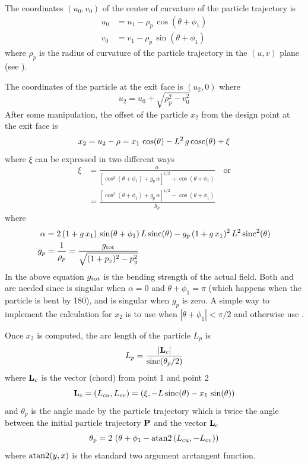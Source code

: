 The coordinates $(u_0, v_0)$ of the center of curvature of the particle trajectory is
\begin{align}
  u_0 &= u_1 - \rho_p \, \cos(\theta + \phi_1) \\
  v_0 &= v_1 - \rho_p \, \sin(\theta + \phi_1)
\end{align}
where $\rho_p$ is the radius of curvature of the particle trajectory in the $(u, v)$ plane (see
).

The coordinates of the particle at the exit face is $(u_2, 0)$ where
\begin{equation}
  u_2 = u_0 + \sqrt{\rho_p^2 - v_0^2}
\end{equation}
After some manipulation, the offset of the particle $x_2$ from the design point at the exit face is
\begin{equation}
  x_2 = u_2 - \rho = x_1 \, \cos(\theta) - L^2 \, g \, \text{cosc}(\theta) + \xi
\end{equation}
where $\xi$ can be expressed in two different ways
\begin{align}
  \xi &= \frac{\alpha}{\left[ \cos^2(\theta + \phi_1) + g_p \, \alpha \right]^{1/2} + \cos(\theta + \phi_1)} 
    \quad \text{or} \label{xctlg1} \\
  &= \frac{\left[ \cos^2(\theta + \phi_1) + g_p \, \alpha \right]^{1/2} - \cos(\theta + \phi_1)}{g_p}
    \label{xctlg2}
\end{align}
where
\begin{align}
  \alpha &= 2 \, (1 + g \, x_1) \, \sin(\theta + \phi_1) \, L \, \text{sinc}(\theta) - 
        g_p \, (1 + g \, x_1)^2 \, L^2 \, \text{sinc}^2(\theta) \\
  g_p &= \frac{1}{\rho_p} = \frac{g_{\text{tot}}}{\sqrt{(1 + p_z)^2 - p_y^2}} \label{g1rg}
\end{align}
In the above equation $g_{\text{tot}}$ is the bending strength of the actual field. Both  and
 are needed since  is singular when $\alpha = 0$ and $\theta + \phi_1 = \pi$
(which happens when the particle is bent by 180\Deg), and  is singular when $g_p$ is
zero. A simple way to implement the calculation for $x_2$ is to use  when $|\theta +
\phi_1| < \pi/2$ and otherwise use .

Once $x_2$ is computed, the arc length of the particle $L_p$ is 
\begin{equation}
  L_p = \frac{|{\bf L}_c|}{\text{sinc}(\theta_p/2)}
\end{equation}
where ${\bf L}_c$ is the vector (chord) from point 1 and point 2
\begin{equation}
  {\bf L}_c = (L_{cu}, L_{cv}) =
  \left( \xi, -L \, \text{sinc}(\theta) - x_1 \, \sin(\theta) \right) 
\end{equation}
and $\theta_p$ is the angle made by the particle trajectory which is twice the angle between
the initial particle trajectory ${\bf P}$ and the vector ${\bf L}_c$
\begin{equation}
  \theta_p = 2 \, \left( \theta + \phi_1 - \text{atan2} \left( L_{cu}, -L_{cv} \right) \right)
\end{equation}
where $\text{atan2}(y, x)$ is the standard two argument arctangent function.


